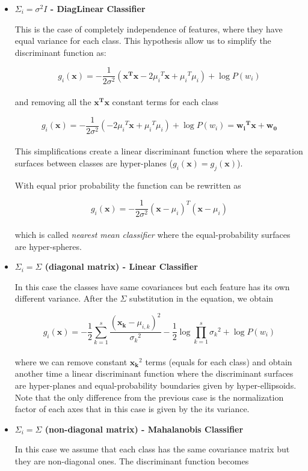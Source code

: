 \documentclass{standalone}
\begin{document}
\begin{itemize}

\item \textbf{$\Sigma_i=\sigma^2I$ - DiagLinear Classifier}

This is the case of completely independence of features, where they have equal variance for each class.
This hypothesis allow us to simplify the discriminant function as:

$$
g_i(\mathbf{x})=-\frac{1}{2\sigma^2}(\mathbf{x^Tx}-2{\mu_i}^T\mathbf{x} + {\mu_i}^T\mu_i) + \log P(w_i)
$$
\\
and removing all the $\mathbf{x^Tx}$ constant terms for each class

$$
g_i(\mathbf{x}) = -\frac{1}{2\sigma^2}(-2{\mu_i}^T\mathbf{x}+{\mu_i}^T\mu_i)+\log P(w_i) = \mathbf{{w_i}^Tx}+\mathbf{w_0}
$$
\\
This simplifications create a linear discriminant function where the separation surfaces between classes are hyper-planes ($g_i(\mathbf{x})=g_j(\mathbf{x})$).

With equal prior probability the function can be rewritten as

$$
g_i(\mathbf{x}) = -\frac{1}{2\sigma^2}(\mathbf{x}-\mu_i)^T(\mathbf{x}-\mu_i)
$$
\\
which is called \emph{nearest mean classifier} where the equal-probability surfaces are hyper-spheres.


\item \textbf{$\Sigma_i = \Sigma$ (diagonal matrix) - Linear Classifier}

In this case the classes have same covariances but each feature has its own different variance.
After the $\Sigma$ substitution in the equation, we obtain

$$
g_i(\mathbf{x}) = -\frac{1}{2}\sum_{k=1}^{s}\frac{(\mathbf{x_k}-\mu_{i,k})^2}{{\sigma_k}^2}-\frac{1}{2}\log\prod_{k=1}^{s}{\sigma_k}^2+\log P(w_i)
$$
\\
where we can remove constant $\mathbf{x_k}^2$ terms (equals for each class) and obtain another time a linear discriminant function where the discriminant surfaces are hyper-planes and equal-probability boundaries given by hyper-ellipsoids.
Note that the only difference from the previous case is the normalization factor of each axes that in this case is given by the its variance.


\item \textbf{$\Sigma_i = \Sigma$ (non-diagonal matrix) - Mahalanobis Classifier}

In this case we assume that each class has the same covariance matrix but they are non-diagonal ones.
The discriminant function becomes


\end{itemize}
\end{document}
